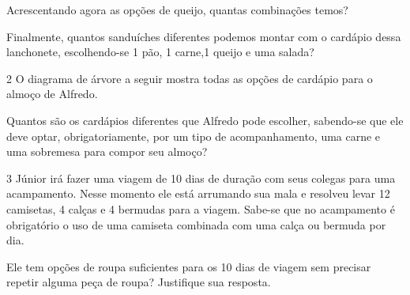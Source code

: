 {\begin{escolha}
\item
  Acrescentando agora as opções de queijo, quantas combinações temos?


\item
  Finalmente, quantos sanduíches diferentes podemos montar com o
  cardápio dessa lanchonete, escolhendo-se 1 pão, 1 carne,1 queijo e uma
  salada?

\end{escolha}


\num{2} O diagrama de árvore a seguir mostra todas as opções de cardápio
para o almoço de Alfredo.


Quantos são os cardápios diferentes que Alfredo pode escolher, sabendo-se
que ele deve optar, obrigatoriamente, por um tipo de acompanhamento, uma
carne e uma sobremesa para compor seu almoço?



\num{3} Júnior irá fazer uma viagem de 10 dias de duração com seus colegas
para uma acampamento. Nesse momento ele está arrumando sua mala e
resolveu levar 12 camisetas, 4 calças e 4 bermudas para a viagem.
Sabe-se que no acampamento é obrigatório o uso de uma camiseta combinada
com uma calça ou bermuda por dia.

Ele tem opções de roupa suficientes para os 10 dias de viagem sem
precisar repetir alguma peça de roupa? Justifique sua resposta.



}
